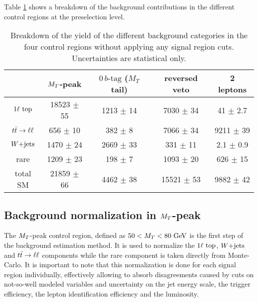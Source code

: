     Table \ref{tab:cutflowControlRegions} shows a breakdown of the background contributions 
    in the different control regions at the preselection level.

\begin{table}[h!]
    \centering
\begin{tabular}{|c|cccc|}
    \hline
                     & $M_T$-peak       & $0\, b\text{-tag}$ ($M_T$ tail) & reversed veto    & 2 leptons             \\ 
    \hline
     $1\ell~\text{top}$ & 18523 $\pm$ 55   &  1213 $\pm$ 14        &  7030 $\pm$ 34   &   41 $\pm$ 2.7  \\  
     $t\bar{t} \rightarrow \ell \ell$  &   656 $\pm$ 10   &   382 $\pm$ 8         &  7066 $\pm$ 34   & 9211 $\pm$ 39   \\
     $\text{$W$+jets}$        &  1470 $\pm$ 24   &  2669 $\pm$ 33        &   331 $\pm$ 11   &  2.1 $\pm$ 0.9  \\ 
     rare            &  1209 $\pm$ 23   &   198 $\pm$ 7         &  1093 $\pm$ 20   &  626 $\pm$ 15   \\
    \hline                                                      
     total SM        & 21859 $\pm$ 66   &  4462 $\pm$ 38        & 15521 $\pm$ 53   & 9882 $\pm$ 42   \\ 
    \hline
\end{tabular}
    \caption{Breakdown of the yield of the different background categories in the four 
    control regions without applying any signal region cuts. Uncertainties are statistical only.}
    \label{tab:cutflowControlRegions}
\end{table}

        \subsection{Background normalization in $M_T$-peak \label{sec:MTpeakNormalization}}

    The $M_T$-peak control region, defined as $50 < M_T < 80 ~\text{GeV}$ is the first step of the
    background estimation method. It is used to normalize the $1\ell~\text{top}$, $\text{$W$+jets}$ and
    $t\bar{t} \rightarrow \ell \ell$ components while the rare component is taken directly from Monte-Carlo.
    It is important to note that this normalization is done for each signal region individually, 
    effectively allowing to absorb disagreements caused by cuts on not-so-well modeled 
    variables and uncertainty on the jet energy scale, the trigger efficiency, the lepton 
    identification efficiency and the luminosity.

